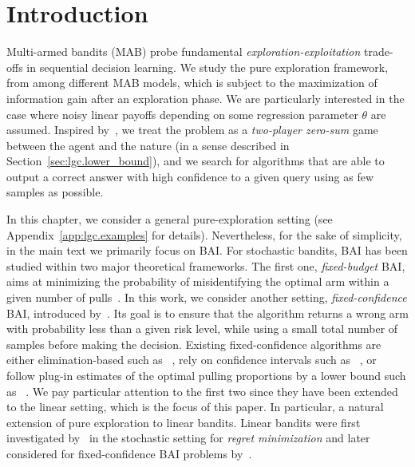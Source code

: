 \section{Introduction}\label{sec:lgc.intro}

Multi-armed bandits (MAB) probe fundamental \emph{exploration-exploitation} trade-offs in sequential decision learning. We study the pure exploration framework, from among different MAB models, which is subject to the maximization of information gain after an exploration phase. We are particularly interested in the case where noisy linear payoffs depending on some regression parameter $\theta$ are assumed. Inspired by~\citet{degenne2019game}, we treat the problem as a \emph{two-player zero-sum} game between the agent and the nature (in a sense described in Section~\ref{sec:lgc.lower_bound}), and we search for algorithms that are able to output a correct answer with high confidence to a given query using as few samples as possible.

In this chapter, we consider a general pure-exploration setting (see Appendix~\ref{app:lgc.examples} for details). Nevertheless, for the sake of simplicity, in the main text we primarily focus on BAI.  For stochastic bandits, BAI has been studied within two major theoretical frameworks. The first one,  \emph{fixed-budget} BAI, aims at minimizing the probability of misidentifying the optimal arm within a given number of pulls~\citep{audibert2010budget}. In this work, we consider another setting, \emph{fixed-confidence} BAI, introduced by~\citet{even-dar2003confidence}. Its goal is to ensure that the algorithm returns a wrong arm with probability less than a given risk level, while using a small total number of samples before making the decision. %
Existing fixed-confidence algorithms are either elimination-based such as \SE~\citep{karnin2013sha}, rely on confidence intervals such as \UGapE~\citep{gabillon2012ugape}, or follow plug-in estimates of the optimal pulling proportions by a lower bound such as \Track~\citep{garivier2016tracknstop}. We pay particular attention to the first two since they have been extended to the linear setting, which is the focus of this paper.
In particular, a natural extension of pure exploration to linear bandits. Linear bandits were first investigated by~\citet{auer2002linear} in the stochastic setting for \emph{regret minimization} and later considered for fixed-confidence BAI problems by~\citet{soare2014linear}.
